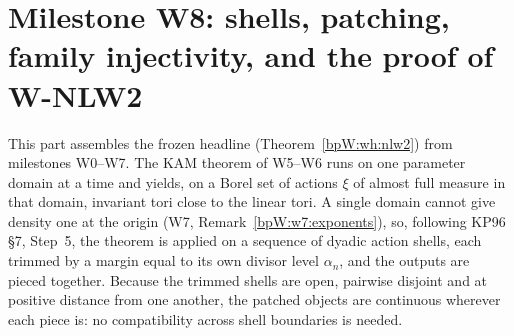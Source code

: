 \section{Milestone W8: shells, patching, family injectivity, and the proof of W-NLW2}\label{bpW:w8}

\providecommand{\Pc}{\mathcal P}

This part assembles the frozen headline  (Theorem~\ref{bpW:wh:nlw2}) from milestones W0--W7.
The KAM theorem of W5--W6 runs on one parameter domain at a time and yields, on a Borel set of actions $\xi$ of
almost full measure in that domain, invariant tori close to the linear tori. A single domain cannot give density one
at the origin (W7, Remark~\ref{bpW:w7:exponents}), so, following KP96 \S7, Step~5, the theorem is applied on a
sequence of dyadic action shells, each trimmed by a margin equal to its own divisor level $\alpha_n$, and the outputs
are pieced together. Because the trimmed shells are open, pairwise disjoint and at positive distance from one another,
the patched objects are continuous wherever each piece is: no compatibility across shell boundaries is needed.

